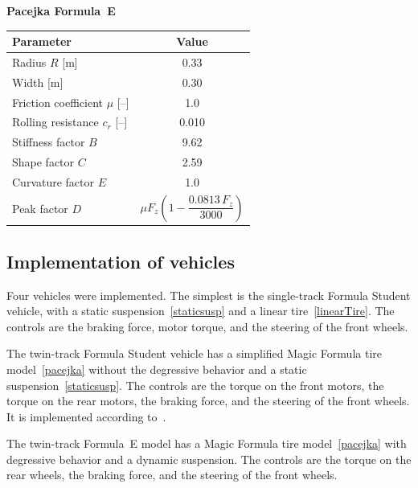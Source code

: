 \begin{table}[H]
    \vspace{1em}

    \begin{minipage}[t]{0.6\textwidth}
        \centering
        \textbf{Pacejka Formula~E}\\[2pt]
        \begin{tabular}{lc}
            \toprule
            Parameter & Value \\
            \midrule
            Radius $R$ [m]                  & 0.33 \\
            Width [m]                       & 0.30 \\
            Friction coefficient $\mu$ [--] & 1.0 \\
            Rolling resistance $c_r$ [--]   & 0.010 \\
            Stiffness factor $B$            & 9.62 \\
            Shape factor $C$                & 2.59 \\
            Curvature factor $E$            & 1.0 \\
            Peak factor $D$                 & $\mu F_z \left(1 - \dfrac{0.0813\,F_z}{3000}\right)$ \\
            \bottomrule
        \end{tabular}
    \end{minipage}
\end{table}


\subsection{Implementation of vehicles}
Four vehicles were implemented. The simplest is the single-track Formula Student vehicle, with a static suspension~\ref{staticsusp} and a linear tire~\ref{linearTire}. The controls are the braking force, motor torque, and the steering of the front wheels.

The twin-track Formula Student vehicle has a simplified Magic Formula tire model~\ref{pacejka} without the degressive behavior and a static suspension~\ref{staticsusp}. The controls are the torque on the front motors, the torque on the rear motors, the braking force, and the steering of the front wheels. It is implemented according to~\cite{2026ClassProject}.

The twin-track Formula~E model has a Magic Formula tire model~\ref{pacejka} with degressive behavior and a dynamic suspension. The controls are the torque on the rear wheels, the braking force, and the steering of the front wheels.

